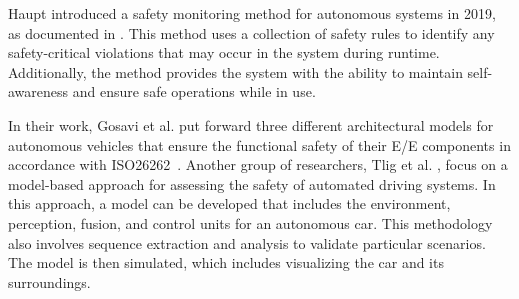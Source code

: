  Haupt introduced a safety monitoring method for autonomous systems in 2019, as documented in \cite{haupt2019runtime}. This method uses a collection of safety rules to identify any safety-critical violations that may occur in the system during runtime. Additionally, the method provides the system with the ability to maintain self-awareness and ensure safe operations while in use.

 In their work, Gosavi et al. \cite{gosavi2018application} put forward three different architectural models for autonomous vehicles that ensure the functional safety of their E/E components in accordance with ISO26262~\cite{iso26262}. Another group of researchers, Tlig et al. \cite{tlig2018autonomous}, focus on a model-based approach for assessing the safety of automated driving systems.
 In this approach, a model can be developed that includes the environment, perception, fusion, and control units for an autonomous car. This methodology also involves sequence extraction and analysis to validate particular scenarios. The model is then simulated, which includes visualizing the car and its surroundings.
